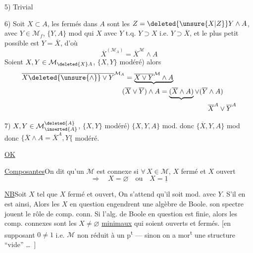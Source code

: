 5) Trivial

6) Soit $X\subset A$, les fermés dans $A$ sont les $Z=\deleted{\unsure{X|Z}}Y\wedge A$, avec $Y\in \mathcal M_f$, $\{Y,A\}$ mod   qui  $X$   avec $Y$ t.q. $Y\supset X$ i.e. $Y\supset\overline X$, et le
plus petit possible est $Y=\overline X$, d'où 
\[
\overline X^{(\mathcal M_A)}=\overline X^{\mathcal M}\wedge A
\]
Soient $X,Y\in \mathcal M_{\deleted{X}A}$, $\{X,Y\}$ modéré) alors
\[
\begin{aligned}
\overline{X\deleted{\unsure{\wedge}}\vee Y}^{\mathcal M_A}
   &=\underbrace{\overline{X\vee Y}^{\mathcal M}\wedge A}\\
   &\hspace{-.4em}(\overline X\vee\overline Y)\wedge A
       =\underbrace{(\overline X\wedge A)}\vee(\overline Y\wedge A)\\
   &\hspace{12em}\overline X^A\vee\overline Y^A
\end{aligned}
\]

7) $X,Y\in \mathcal M_{\inserted{A}}^{\deleted{A}}$, $\{X,Y\}$ modéré)   $\{X,Y,A\}$ mod. donc $\{\overline X,Y,A\}$ mod donc $\{\overline X\wedge A=\overline X^A,Y\{$ modéré.

\uline{OK}

\uline{Composantes}\qquad On dit qu'un $\mathcal M$ est connexe si  $\forall\,X\in \mathcal M$, $X$ fermé et $X$ ouvert
\[
\Longrightarrow\quad X=\varnothing\quad\text{ou}\quad X=\underline{1}
\]

\uline{NB}\qquad Soit $X$ tel que $X$ fermé et ouvert, On s'attend qu'il soit mod. avec  $Y$. S'il en est ainsi, Alors les $X$ en question engendrent une algèbre de Boole.    son spectre jouent le rôle de comp. conn. Si l'alg.
de Boole en question est finie, alors les comp. connexes sont les  $X\ne\varnothing$ \uline{minimaux} qui soient ouverts et fermés. [en supposant $0\ne1$
i.e. $\mathcal M$ non réduit à un p\textsuperscript{t} --- sinon on a  mor\textsuperscript{t} une structure ``vide'' \ldots\ ]

